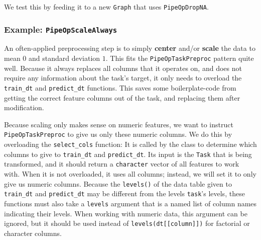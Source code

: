 \documentclass[
  11pt,
  parskip=half,
  DIV=calc,
  BCOR=10mm,
  x11names]{scrbook}
\newenvironment{Shaded}{}{}
\newcommand{\DecValTok}[1]{#1}
\newcommand{\KeywordTok}[1]{\textcolor[rgb]{0.00,0.00,1.00}{#1}}
\newcommand{\NormalTok}[1]{#1}
\newcommand{\OperatorTok}[1]{#1}
\newcommand{\StringTok}[1]{\textcolor[rgb]{0.00,0.50,0.50}{#1}}
\begin{document}
We test this by feeding it to a new \texttt{Graph} that uses \texttt{PipeOpDropNA}.

\begin{Shaded}
\end{Shaded}

\hypertarget{example-pipeopscalealways}{%
\subsubsection{\texorpdfstring{Example: \texttt{PipeOpScaleAlways}}{Example: PipeOpScaleAlways}}\label{example-pipeopscalealways}}

An often-applied preprocessing step is to simply \textbf{center} and/or \textbf{scale} the data to mean \(0\) and standard deviation \(1\).
This fits the \texttt{PipeOpTaskPreproc} pattern quite well.
Because it always replaces all columns that it operates on, and does not require any information about the task's target, it only needs to overload the \texttt{train\_dt} and \texttt{predict\_dt} functions.
This saves some boilerplate-code from getting the correct feature columns out of the task, and replacing them after modification.

Because scaling only makes sense on numeric features, we want to instruct \texttt{PipeOpTaskPreproc} to give us only these numeric columns.
We do this by overloading the \texttt{select\_cols} function: It is called by the class to determine which columns to give to \texttt{train\_dt} and \texttt{predict\_dt}.
Its input is the \texttt{Task} that is being transformed, and it should return a \texttt{character} vector of all features to work with.
When it is not overloaded, it uses all columns; instead, we will set it to only give us numeric columns.
Because the \texttt{levels()} of the data table given to \texttt{train\_dt} and \texttt{predict\_dt} may be different from the levels \texttt{task}'s levels, these functions must also take a \texttt{levels} argument that is a named list of column names indicating their levels.
When working with numeric data, this argument can be ignored, but it should be used instead of \texttt{levels(dt{[}{[}column{]}{]})} for factorial or character columns.
\end{document}
